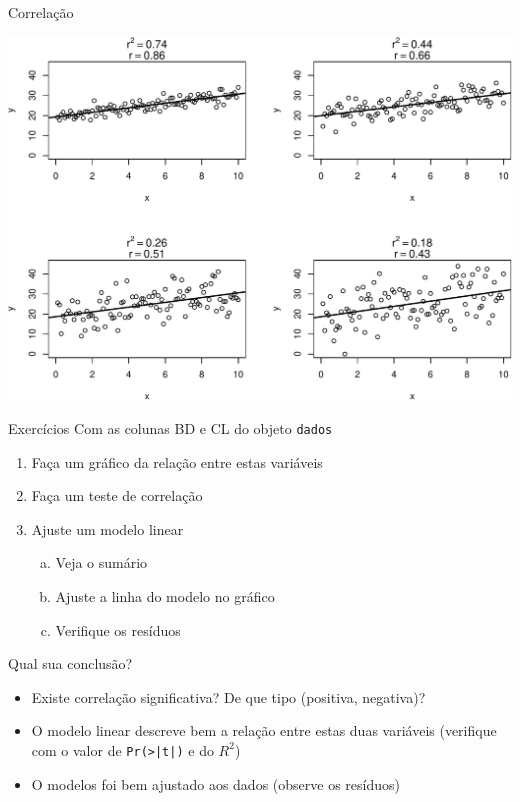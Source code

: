 \documentclass[10pt]{beamer}\usepackage[]{graphicx}\usepackage[]{color}
\newenvironment{knitrout}{}{} %
\theoremstyle{definition}
\begin{document}
\begin{frame}[fragile]{Correlação}
\begin{knitrout}\footnotesize
{}\color{fgcolor}

{\centering \includegraphics[width=.8\textwidth]{figure/reg-1} 

}



\end{knitrout}
\end{frame}

\begin{frame}[fragile]{Exercícios}
Com as colunas BD e CL do objeto \texttt{dados}
\begin{enumerate}[(1)]
\item Faça um gráfico da relação entre estas variáveis
\item Faça um teste de correlação
\item Ajuste um modelo linear
  \begin{enumerate}[(a)]
  \item Veja o sumário
  \item Ajuste a linha do modelo no gráfico
  \item Verifique os resíduos
  \end{enumerate}
\end{enumerate}
Qual sua conclusão?
\small
\begin{itemize}
\item Existe correlação significativa? De que tipo (positiva, negativa)?
\item O modelo linear descreve bem a relação entre estas duas variáveis
  (verifique com o valor de \verb+Pr(>|t|)+ e do $R^2$)
\item O modelos foi bem ajustado aos dados (observe os resíduos)
\end{itemize}
\end{frame}
\end{document}
